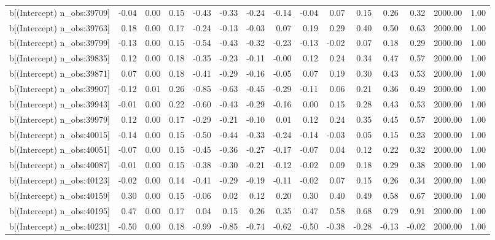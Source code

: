 \begin{table}[ht]
\begin{tabular}{rrrrrrrrrrrrrrr}
  b[(Intercept) n\_obs:39709] & -0.04 & 0.00 & 0.15 & -0.43 & -0.33 & -0.24 & -0.14 & -0.04 & 0.07 & 0.15 & 0.26 & 0.32 & 2000.00 & 1.00 \\ 
  b[(Intercept) n\_obs:39763] & 0.18 & 0.00 & 0.17 & -0.24 & -0.13 & -0.03 & 0.07 & 0.19 & 0.29 & 0.40 & 0.50 & 0.63 & 2000.00 & 1.00 \\ 
  b[(Intercept) n\_obs:39799] & -0.13 & 0.00 & 0.15 & -0.54 & -0.43 & -0.32 & -0.23 & -0.13 & -0.02 & 0.07 & 0.18 & 0.29 & 2000.00 & 1.00 \\ 
  b[(Intercept) n\_obs:39835] & 0.12 & 0.00 & 0.18 & -0.35 & -0.23 & -0.11 & -0.00 & 0.12 & 0.24 & 0.34 & 0.47 & 0.57 & 2000.00 & 1.00 \\ 
  b[(Intercept) n\_obs:39871] & 0.07 & 0.00 & 0.18 & -0.41 & -0.29 & -0.16 & -0.05 & 0.07 & 0.19 & 0.30 & 0.43 & 0.53 & 2000.00 & 1.00 \\ 
  b[(Intercept) n\_obs:39907] & -0.12 & 0.01 & 0.26 & -0.85 & -0.63 & -0.45 & -0.29 & -0.11 & 0.06 & 0.21 & 0.36 & 0.49 & 2000.00 & 1.00 \\ 
  b[(Intercept) n\_obs:39943] & -0.01 & 0.00 & 0.22 & -0.60 & -0.43 & -0.29 & -0.16 & 0.00 & 0.15 & 0.28 & 0.43 & 0.53 & 2000.00 & 1.00 \\ 
  b[(Intercept) n\_obs:39979] & 0.12 & 0.00 & 0.17 & -0.29 & -0.21 & -0.10 & 0.01 & 0.12 & 0.24 & 0.35 & 0.45 & 0.57 & 2000.00 & 1.00 \\ 
  b[(Intercept) n\_obs:40015] & -0.14 & 0.00 & 0.15 & -0.50 & -0.44 & -0.33 & -0.24 & -0.14 & -0.03 & 0.05 & 0.15 & 0.23 & 2000.00 & 1.00 \\ 
  b[(Intercept) n\_obs:40051] & -0.07 & 0.00 & 0.15 & -0.45 & -0.36 & -0.27 & -0.17 & -0.07 & 0.04 & 0.12 & 0.22 & 0.32 & 2000.00 & 1.00 \\ 
  b[(Intercept) n\_obs:40087] & -0.01 & 0.00 & 0.15 & -0.38 & -0.30 & -0.21 & -0.12 & -0.02 & 0.09 & 0.18 & 0.29 & 0.38 & 2000.00 & 1.00 \\ 
  b[(Intercept) n\_obs:40123] & -0.02 & 0.00 & 0.14 & -0.41 & -0.29 & -0.19 & -0.11 & -0.02 & 0.07 & 0.15 & 0.26 & 0.34 & 2000.00 & 1.00 \\ 
  b[(Intercept) n\_obs:40159] & 0.30 & 0.00 & 0.15 & -0.06 & 0.02 & 0.12 & 0.20 & 0.30 & 0.40 & 0.49 & 0.58 & 0.67 & 2000.00 & 1.00 \\ 
  b[(Intercept) n\_obs:40195] & 0.47 & 0.00 & 0.17 & 0.04 & 0.15 & 0.26 & 0.35 & 0.47 & 0.58 & 0.68 & 0.79 & 0.91 & 2000.00 & 1.00 \\ 
  b[(Intercept) n\_obs:40231] & -0.50 & 0.00 & 0.18 & -0.99 & -0.85 & -0.74 & -0.62 & -0.50 & -0.38 & -0.28 & -0.13 & -0.02 & 2000.00 & 1.00 \\ 

\end{tabular}
\end{table}

